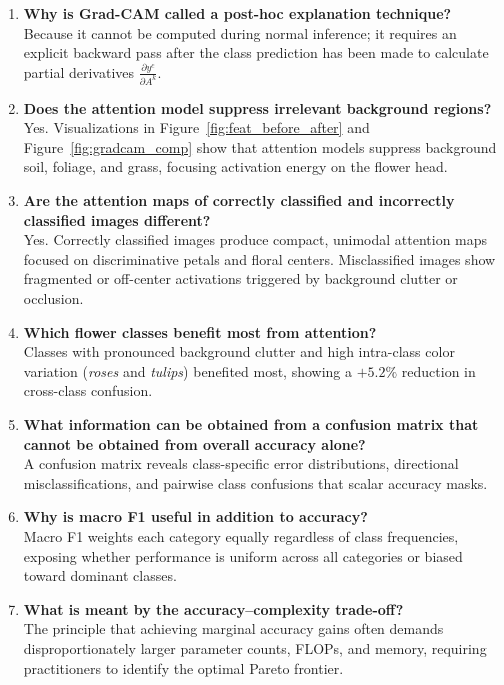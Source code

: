 \documentclass[11pt,a4paper]{article}
\begin{document}
\begin{enumerate}[label=\textbf{\arabic*.}]
    \item \textbf{Why is Grad-CAM called a post-hoc explanation technique?} \\
    Because it cannot be computed during normal inference; it requires an explicit backward pass after the class prediction has been made to calculate partial derivatives $\frac{\partial y^c}{\partial A^k}$.

    \item \textbf{Does the attention model suppress irrelevant background regions?} \\
    Yes. Visualizations in Figure~\ref{fig:feat_before_after} and Figure~\ref{fig:gradcam_comp} show that attention models suppress background soil, foliage, and grass, focusing activation energy on the flower head.

    \item \textbf{Are the attention maps of correctly classified and incorrectly classified images different?} \\
    Yes. Correctly classified images produce compact, unimodal attention maps focused on discriminative petals and floral centers. Misclassified images show fragmented or off-center activations triggered by background clutter or occlusion.

    \item \textbf{Which flower classes benefit most from attention?} \\
    Classes with pronounced background clutter and high intra-class color variation (\textit{roses} and \textit{tulips}) benefited most, showing a $+5.2\%$ reduction in cross-class confusion.

    \item \textbf{What information can be obtained from a confusion matrix that cannot be obtained from overall accuracy alone?} \\
    A confusion matrix reveals class-specific error distributions, directional misclassifications, and pairwise class confusions that scalar accuracy masks.

    \item \textbf{Why is macro F1 useful in addition to accuracy?} \\
    Macro F1 weights each category equally regardless of class frequencies, exposing whether performance is uniform across all categories or biased toward dominant classes.

    \item \textbf{What is meant by the accuracy--complexity trade-off?} \\
    The principle that achieving marginal accuracy gains often demands disproportionately larger parameter counts, FLOPs, and memory, requiring practitioners to identify the optimal Pareto frontier.


\end{enumerate}
\end{document}
